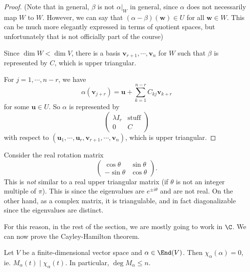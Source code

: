 \documentclass[a4paper]{article}
\begin{document}
\begin{proof}
  (Note that in general, $\beta$ is not $\alpha|_W$ in general, since $\alpha$ does not necessarily map $W$ to $W$. However, we can say that $(\alpha - \beta) (\mathbf{w}) \in U$ for all $\mathbf{w}\in W$. This can be much more elegantly expressed in terms of quotient spaces, but unfortunately that is not officially part of the course)

  Since $\dim W < \dim V$, there is a basis $\mathbf{v}_{r + 1}, \cdots, \mathbf{v}_n$ for $W$ such that $\beta$ is represented by $C$, which is upper triangular.

  For $j = 1, \cdots, n - r$, we have
  \[
    \alpha(\mathbf{v}_{j + r}) = \mathbf{u} + \sum_{k = 1}^{n - r} C_{kj} \mathbf{v}_{k + r}
  \]
  for some $\mathbf{u} \in U$. So $\alpha$ is represented by
  \[
    \begin{pmatrix}
      \lambda I_r & \text{stuff}\\
      0 & C
    \end{pmatrix}
  \]
  with respect to $(\mathbf{u}_1, \cdots, \mathbf{u}_r, \mathbf{v}_{r + 1}, \cdots, \mathbf{v}_n)$, which is upper triangular.
\end{proof}

\begin{eg}
  Consider the real rotation matrix
  \[
    \begin{pmatrix}
      \cos \theta & \sin \theta\\
      -\sin \theta & \cos \theta
    \end{pmatrix}.
  \]
  This is \emph{not} similar to a real upper triangular matrix (if $\theta$ is not an integer multiple of $\pi$). This is since the eigenvalues are $e^{\pm i\theta}$ and are not real. On the other hand, as a complex matrix, it is triangulable, and in fact diagonalizable since the eigenvalues are distinct.
\end{eg}
For this reason, in the rest of the section, we are mostly going to work in $\C$. We can now prove the Cayley-Hamilton theorem.

\begin{thm}
  Let $V$ be a finite-dimensional vector space and $\alpha \in \End(V)$. Then $\chi_\alpha(\alpha) = 0$, ie. $M_\alpha(t) \mid \chi_\alpha(t)$. In particular, $\deg M_\alpha \leq n$.
\end{thm}
\end{document}
